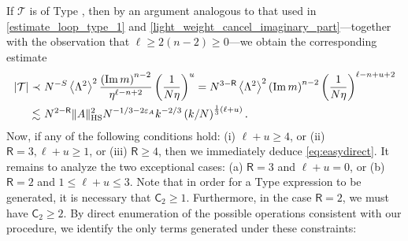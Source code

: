 \documentclass[10pt,reqno]{amsart}
\numberwithin{equation}{section}
\numberwithin{figure}{section}
\newcommand{\rmnum}[1]{\uppercase\expandafter{\romannumeral #1}}
\theoremstyle{plain} %
\theoremstyle{definition} %
\renewcommand{\txt}[1]{\text{\rm{#1}}}
\newcommand{\cT}{\mathcal T}
\newcommand{\sR}{\mathsf R}
\newcommand{\sC}{\mathsf C}
\renewcommand{\leq}{\le}
\renewcommand{\geq}{\ge}
\newcommand{\pa}[1]{\left({#1}\right)}
\newcommand{\absa}[1]{\left\lvert #1 \right\rvert}
\newcommand{\norm}[1]{\lVert #1 \rVert}
\newcommand{\avga}[1]{\left\langle #1 \right\rangle}
\DeclareMathOperator{\im}{\mathrm{Im}}
\newcommand{\HS}{\txt{HS}}
\newcommand{\mm}{\ell}
\numberwithin{equation}{section}
\begin{document}
      
      
      If $\cT$ is of Type \rmnum{2}, then by an argument analogous to that used in \eqref{estimate_loop_type_1} and \eqref{light_weight_cancel_imaginary_part}---together with the observation that $\mm\geq 2\pa{n-2}\geq 0$---we obtain the corresponding estimate
      \begin{equation}\nonumber
          \begin{aligned}
              \absa{\cT}\prec&~ N^{-S}\avga{\Lambda^2}^2\frac{\pa{\im m}^{n-2}}{\eta^{\mm-n+2}}\pa{\frac{1}{N\eta}}^{u}
              = N^{3-\sR} \avga{\Lambda^2}^2 \pa{\im m}^{n-2} \pa{\frac{1}{N\eta}}^{\mm-n+u+2}\\
              \lesssim&~ N^{2-\sR}\norm{A}_{\HS}^2N^{-1/3-2\varepsilon_A}k^{-2/3}\pa{k/N}^{\frac 1 3 (\mm+u)}.
          \end{aligned}
      \end{equation}
Now, if any of the following conditions hold: (i) $\mm+u\geq 4$, or (ii) $\sR=3, \mm+u\geq 1$, or (iii) $\sR\geq 4$, then we immediately deduce \eqref{eq:easydirect}.
It remains to analyze the two exceptional cases: (a) $\sR=3$ and $\mm+u=0$, or (b) $\sR= 2$ and  $1\leq \mm+u\leq 3$. Note that in order for a Type \rmnum{2} expression to be generated, it is necessary that $\sC_2\geq 1$. Furthermore, in the case  $\sR=2$, we must have $\sC_2\geq 2$. 
By direct enumeration of the possible operations consistent with our procedure, we identify the only terms generated under these constraints:
\end{document}
